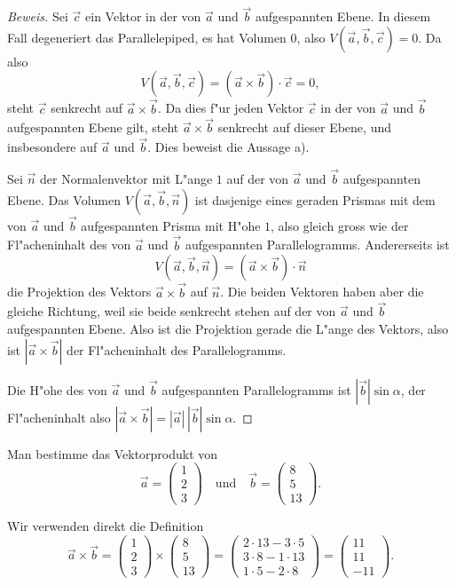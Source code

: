 \begin{proof}[Beweis]
Sei $\vec c$ ein Vektor in der von $\vec a$ und $\vec b$ aufgespannten
Ebene.
In diesem Fall degeneriert das Parallelepiped, es hat Volumen $0$,
also $V(\vec a,\vec b,\vec c)= 0$.
Da also
\[
V(\vec a,\vec b,\vec c)=(\vec a\times \vec b)\cdot \vec c=0,
\]
steht $\vec c$ senkrecht auf $\vec a\times\vec b$.
Da dies f"ur jeden
Vektor $\vec c$ in der von $\vec a$ und $\vec b$ aufgespannten Ebene
gilt, steht $\vec a\times\vec b$ senkrecht auf dieser Ebene, und insbesondere
auf $\vec a$ und $\vec b$.
Dies beweist die Aussage a).

Sei $\vec n$ der Normalenvektor mit L"ange $1$ auf der von $\vec a$ und
$\vec b$ aufgespannten Ebene.
Das Volumen $V(\vec a,\vec b,\vec n)$ ist
dasjenige eines geraden Prismas mit dem von $\vec a$ und $\vec b$
aufgespannten Prisma mit H"ohe $1$, also gleich gross wie der
Fl"acheninhalt des von $\vec a$ und $\vec b$ aufgespannten Parallelogramms.
Andererseits ist
\[
V(\vec a,\vec b,\vec n)=(\vec a\times\vec b)\cdot \vec n
\]
die Projektion des Vektors $\vec a\times\vec b$ auf $\vec n$.
Die beiden
Vektoren haben aber die gleiche Richtung, weil sie beide senkrecht stehen
auf der von $\vec a$ und $\vec b$ aufgespannten Ebene.
Also ist die Projektion
gerade die L"ange des Vektors, also ist
$|\vec a\times\vec b|$ der Fl"acheninhalt des Parallelogramms.

Die H"ohe des von $\vec a$ und $\vec b$ aufgespannten Parallelogramms
ist $|\vec b|\sin \alpha$, der Fl"acheninhalt also
$|\vec a\times\vec b|=|\vec a|\,|\vec b|\sin\alpha.$
\end{proof}

\begin{beispiel}
Man bestimme das Vektorprodukt von
\[
\vec a=\begin{pmatrix}1\\2\\3\end{pmatrix}
\quad\text{und}\quad
\vec b=\begin{pmatrix}8\\5\\13\end{pmatrix}.
\]

\smallskip
{\parindent 0pt Wir verwenden direkt die Definition}
\[
\vec a\times \vec b=
\begin{pmatrix}1\\2\\3\end{pmatrix}
\times
\begin{pmatrix}8\\5\\13\end{pmatrix}
=
\begin{pmatrix}
2\cdot 13-3\cdot 5\\
3\cdot 8-1\cdot 13\\
1\cdot 5-2\cdot 8
\end{pmatrix}
=
\begin{pmatrix}
11\\
11\\
-11
\end{pmatrix}.
\]
\end{beispiel}

